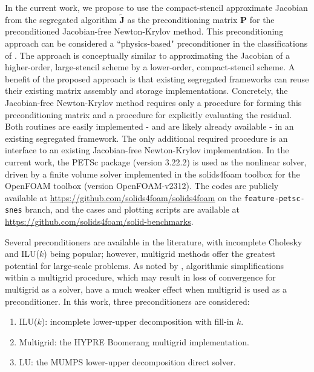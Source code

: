 \documentclass[sn-mathphys,Numbered]{sn-jnl}%
\newcommand{\bb}{\boldsymbol}
\begin{document}
In the current work, we propose to use the compact-stencil approximate Jacobian from the segregated algorithm $\tilde{\bb{J}}$ as the preconditioning matrix $\bb{P}$ for the preconditioned Jacobian-free Newton-Krylov method.
This preconditioning approach can be considered a ``physics-based" preconditioner in the classifications of \citet{Knoll2004}.
The approach is conceptually similar to approximating the Jacobian of a higher-order, large-stencil scheme by a lower-order, compact-stencil scheme.
A benefit of the proposed approach is that existing segregated frameworks can reuse their existing matrix assembly and storage implementations.
Concretely, the Jacobian-free Newton-Krylov method requires only a procedure for forming this preconditioning matrix and a procedure for explicitly evaluating the residual.
Both routines are easily implemented - and are likely already available - in an existing segregated framework.
The only additional required procedure is an interface to an existing Jacobian-free Newton-Krylov implementation.
In the current work, the PETSc package (version 3.22.2) \cite{PETSc} is used as the nonlinear solver, driven by a finite volume solver implemented in the solids4foam toolbox \citep{Cardiff2018, Tukovic2018} for the OpenFOAM toolbox \citep{Weller1998} (version OpenFOAM-v2312).
The codes are publicly available at \url{https://github.com/solids4foam/solids4foam} on the \texttt{feature-petsc-snes} branch, and the cases and plotting scripts are available at \url{https://github.com/solids4foam/solid-benchmarks}.

Several preconditioners are available in the literature, with incomplete Cholesky and ILU($k$) being popular; however, multigrid methods offer the greatest potential for large-scale problems.
As noted by \citet{Knoll2004}, algorithmic simplifications within a multigrid procedure, which may result in loss of convergence for multigrid as a solver, have a much weaker effect when multigrid is used as a preconditioner.
In this work, three preconditioners are considered:
\begin{enumerate}
	\item ILU($k$): incomplete lower-upper decomposition with fill-in $k$. %
	\item Multigrid: the HYPRE Boomerang \citep{hypre} multigrid implementation.
	\item LU: the MUMPS \citep{MUMPS:1, MUMPS:2} lower-upper decomposition direct solver.
\end{enumerate}
\end{document}
